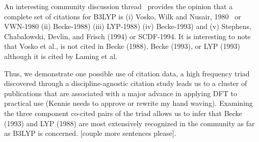 \documentclass[11pt, oneside]{article}   	%
\begin{document}
An interesting community discussion thread~\citep{johansson2002} provides the opinion that a complete set of citations for B3LYP is (i) Vosko, Wilk and Nusair, 1980~\citep{vosko1980accurate} or VWN-1980 (ii) Becke-1988) (iii) LYP-1988) (iv) Becke-1993) and (v) Stephens, Chabalowski, Devlin, and Frisch (1994) or SCDF-1994. It is interesting to note that Vosko et al., is not cited in Becke (1988), Becke (1993), or LYP (1993) although it is cited by Laming et al.  

Thus, we demonstrate one possible use of citation data, a high frequency triad discovered through a discipline-agnostic citation study leads us to a cluster of publications that are associated with a major advance in applying DFT to practical use (Kennie needs to approve or rewrite my hand waving). Examining the three component co-cited pairs of the triad allows us to infer that Becke (1993) and LYP (1988) are most extensively recognized in the community as far as B3LYP is concerned. [couple more sentences please].



\end{document}
